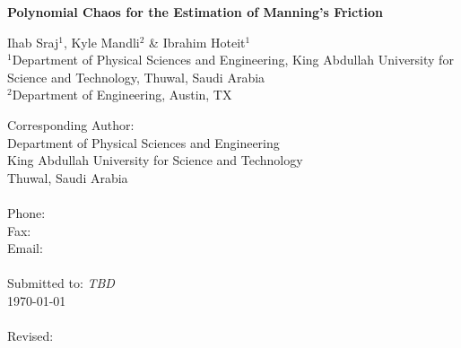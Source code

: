\renewcommand{\thefootnote}{\fnsymbol{footnote}}

\begin{center}
\begin{Large}
{\bf Polynomial Chaos for the Estimation of Manning's Friction}\\

\end{Large}
\bigskip
\bigskip
Ihab Sraj$^1$, Kyle Mandli$^2$ \& Ibrahim Hoteit$^1$\\
\bigskip
$^1$Department of Physical Sciences and Engineering,
King Abdullah University for Science and Technology, Thuwal, Saudi Arabia \\
$^2$Department of Engineering, Austin, TX 
\end{center}

\vspace{5.5cm}

\begin{tabbing}
Corresponding Author: \hspace{5mm} \=  \\
       \> Department of Physical Sciences and Engineering \\
       \> King Abdullah University for Science and Technology \\
       \> Thuwal, Saudi Arabia\\
       \> \\
Phone: \>  \\
Fax:   \>  \\
Email: \>    \\
\\
Submitted to: \> {\it TBD} \\
\> \today \\
\\
Revised: \>  

\end{tabbing}





